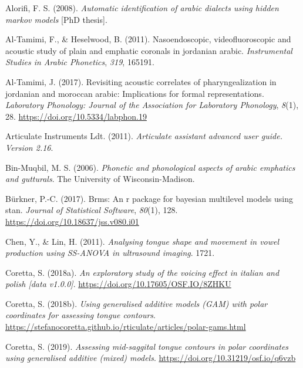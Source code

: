 \documentclass[
  man,
  longtable,
  nolmodern,
  notxfonts,
  notimes,
  colorlinks=true,linkcolor=blue,citecolor=blue,urlcolor=blue]{apa7}
\newlength{\cslhangindent}
\newenvironment{CSLReferences}[2] %
 {\begin{list}{}{%
  \setlength{\itemindent}{0pt}
  \setlength{\leftmargin}{0pt}
  \setlength{\parsep}{0pt}
  \ifodd #1
   \setlength{\leftmargin}{\cslhangindent}
   \setlength{\itemindent}{-1\cslhangindent}
  \fi
  \setlength{\itemsep}{#2\baselineskip}}}
 {\end{list}}
\begin{document}
\label{refs}
\begin{CSLReferences}{1}{0}
Alorifi, F. S. (2008). \emph{Automatic identification of arabic dialects
using hidden markov models} {[}PhD thesis{]}.

Al-Tamimi, F., \& Heselwood, B. (2011). Nasoendoscopic,
videofluoroscopic and acoustic study of plain and emphatic coronals in
jordanian arabic. \emph{Instrumental Studies in Arabic Phonetics},
\emph{319}, 165191.

Al-Tamimi, J. (2017). Revisiting acoustic correlates of
pharyngealization in jordanian and moroccan arabic: Implications for
formal representations. \emph{Laboratory Phonology: Journal of the
Association for Laboratory Phonology}, \emph{8}(1), 28.
\url{https://doi.org/10.5334/labphon.19}

Articulate Instruments Ldt. (2011). \emph{Articulate assistant advanced
user guide. {Version} 2.16}.

Bin-Muqbil, M. S. (2006). \emph{Phonetic and phonological aspects of
arabic emphatics and gutturals}. The University of Wisconsin-Madison.

Bürkner, P.-C. (2017). Brms: An r package for bayesian multilevel models
using stan. \emph{Journal of Statistical Software}, \emph{80}(1), 128.
\url{https://doi.org/10.18637/jss.v080.i01}

Chen, Y., \& Lin, H. (2011). \emph{Analysing tongue shape and movement
in vowel production using SS-ANOVA in ultrasound imaging}. 1721.

Coretta, S. (2018a). \emph{An exploratory study of the voicing effect in
italian and polish {[}data v1.0.0{]}}.
\url{https://doi.org/10.17605/OSF.IO/8ZHKU}

Coretta, S. (2018b). \emph{Using generalised additive models (GAM) with
polar coordinates for assessing tongue contours}.
\url{https://stefanocoretta.github.io/rticulate/articles/polar-gams.html}

Coretta, S. (2019). \emph{Assessing mid-saggital tongue contours in
polar coordinates using generalised additive (mixed) models}.
\url{https://doi.org/10.31219/osf.io/q6vzb}


\end{CSLReferences}
\end{document}
